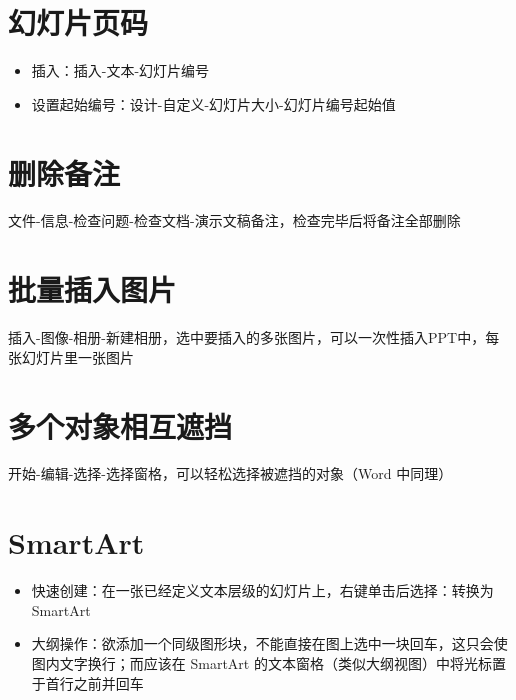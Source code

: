 \documentclass[]{ctexbook}
\providecommand{\tightlist}{%
  \setlength{\itemsep}{0pt}\setlength{\parskip}{0pt}}
\begin{document}
\hypertarget{ux5e7bux706fux7247ux9875ux7801}{%
\section{幻灯片页码}\label{ux5e7bux706fux7247ux9875ux7801}}

\begin{itemize}
\tightlist
\item
  插入：插入-文本-幻灯片编号
\item
  设置起始编号：设计-自定义-幻灯片大小-幻灯片编号起始值
\end{itemize}

\hypertarget{ux5220ux9664ux5907ux6ce8}{%
\section{删除备注}\label{ux5220ux9664ux5907ux6ce8}}

文件-信息-检查问题-检查文档-演示文稿备注，检查完毕后将备注全部删除

\hypertarget{ux6279ux91cfux63d2ux5165ux56feux7247}{%
\section{批量插入图片}\label{ux6279ux91cfux63d2ux5165ux56feux7247}}

插入-图像-相册-新建相册，选中要插入的多张图片，可以一次性插入PPT中，每张幻灯片里一张图片

\hypertarget{ux591aux4e2aux5bf9ux8c61ux76f8ux4e92ux906eux6321}{%
\section{多个对象相互遮挡}\label{ux591aux4e2aux5bf9ux8c61ux76f8ux4e92ux906eux6321}}

开始-编辑-选择-选择窗格，可以轻松选择被遮挡的对象（Word 中同理）

\hypertarget{smartart}{%
\section{SmartArt}\label{smartart}}

\begin{itemize}
\tightlist
\item
  快速创建：在一张已经定义文本层级的幻灯片上，右键单击后选择：转换为 SmartArt
\item
  大纲操作：欲添加一个同级图形块，不能直接在图上选中一块回车，这只会使图内文字换行；而应该在 SmartArt 的文本窗格（类似大纲视图）中将光标置于首行之前并回车
\end{itemize}
\end{document}
